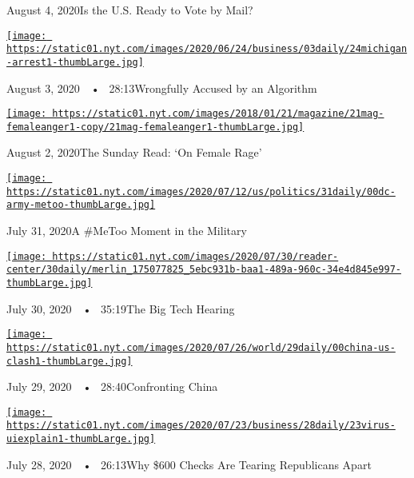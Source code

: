 August 4, 2020Is the U.S. Ready to Vote by Mail?

\href{https://www.nytimes.com/2020/08/03/podcasts/the-daily/algorithmic-justice-racism.html?action=click\&module=audio-series-bar\&region=header\&pgtype=Article}{\texttt{[image: https://static01.nyt.com/images/2020/06/24/business/03daily/24michigan-arrest1-thumbLarge.jpg]}}

August 3, 2020~~•~ 28:13Wrongfully Accused by an Algorithm

\href{https://www.nytimes.com/2020/08/02/podcasts/the-daily/on-female-rage.html?action=click\&module=audio-series-bar\&region=header\&pgtype=Article}{\texttt{[image: https://static01.nyt.com/images/2018/01/21/magazine/21mag-femaleanger1-copy/21mag-femaleanger1-thumbLarge.jpg]}}

August 2, 2020The Sunday Read: `On Female Rage'

\href{https://www.nytimes.com/2020/07/31/podcasts/the-daily/vanessa-guillen-military-metoo.html?action=click\&module=audio-series-bar\&region=header\&pgtype=Article}{\texttt{[image: https://static01.nyt.com/images/2020/07/12/us/politics/31daily/00dc-army-metoo-thumbLarge.jpg]}}

July 31, 2020A \#MeToo Moment in the Military

\href{https://www.nytimes.com/2020/07/30/podcasts/the-daily/congress-facebook-amazon-google-apple.html?action=click\&module=audio-series-bar\&region=header\&pgtype=Article}{\texttt{[image: https://static01.nyt.com/images/2020/07/30/reader-center/30daily/merlin\_175077825\_5ebc931b-baa1-489a-960c-34e4d845e997-thumbLarge.jpg]}}

July 30, 2020~~•~ 35:19The Big Tech Hearing

\href{https://www.nytimes.com/2020/07/29/podcasts/the-daily/china-trump-foreign-policy.html?action=click\&module=audio-series-bar\&region=header\&pgtype=Article}{\texttt{[image: https://static01.nyt.com/images/2020/07/26/world/29daily/00china-us-clash1-thumbLarge.jpg]}}

July 29, 2020~~•~ 28:40Confronting China

\href{https://www.nytimes.com/2020/07/28/podcasts/the-daily/unemployment-benefits-coronavirus.html?action=click\&module=audio-series-bar\&region=header\&pgtype=Article}{\texttt{[image: https://static01.nyt.com/images/2020/07/23/business/28daily/23virus-uiexplain1-thumbLarge.jpg]}}

July 28, 2020~~•~ 26:13Why \$600 Checks Are Tearing Republicans Apart

